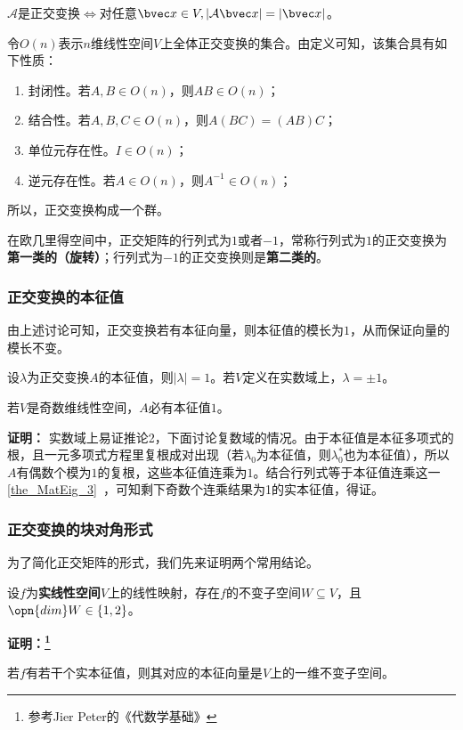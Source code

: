 $\mathcal A$是正交变换$\Longleftrightarrow $对任意$\bvec x\in V,|\mathcal A\bvec x|=|\bvec x|$。

令$O(n)$表示$n$维线性空间$V$上全体正交变换的集合。由定义可知，该集合具有如下性质：
\begin{enumerate}
\item 封闭性。若$A,B\in O(n)$，则$AB\in O(n)$；
\item 结合性。若$A,B,C\in O(n)$，则$A(BC)=(AB)C$；
\item 单位元存在性。$I\in O(n)$；
\item 逆元存在性。若$A\in O(n)$，则$A^{-1}\in O(n)$；
\end{enumerate}
所以，正交变换构成一个群。

在欧几里得空间中，正交矩阵的行列式为$1$或者$-1$，常称行列式为$1$的正交变换为\textbf{第一类的（旋转）}；行列式为$-1$的正交变换则是\textbf{第二类的}。
\subsubsection{正交变换的本征值}
由上述讨论可知，正交变换若有本征向量，则本征值的模长为$1$，从而保证向量的模长不变。
\begin{corollary}{}
 设$\lambda$为正交变换$A$的本征值，则$|\lambda|=1$。若$V$定义在实数域上，$\lambda=\pm 1$。
\end{corollary}
\begin{corollary}{}
若$V$是奇数维线性空间，$A$必有本征值$1$。
\end{corollary}
\textbf{证明：}
实数域上易证推论2，下面讨论复数域的情况。由于本征值是本征多项式的根，且一元多项式方程里复根成对出现（若$\lambda_0$为本征值，则$\lambda_0^{*}$也为本征值），所以$A$有偶数个模为$1$的复根，这些本征值连乘为$1$。结合行列式等于本征值连乘这一\autoref{the_MatEig_3}~，可知剩下奇数个连乘结果为1的实本征值，得证。
\subsubsection{正交变换的块对角形式}
为了简化正交矩阵的形式，我们先来证明两个常用结论。
\begin{lemma}{}\label{lem_ortho_1}
设$f$为\textbf{实线性空间}$V$上的线性映射，存在$f$的不变子空间$W\subseteq V$，且$\opn{dim}W\in\{1,2\}$。
\end{lemma}
\textbf{证明：\footnote{参考Jier Peter的《代数学基础》}}

若$f$有若干个实本征值，则其对应的本征向量是$V$上的一维不变子空间。


